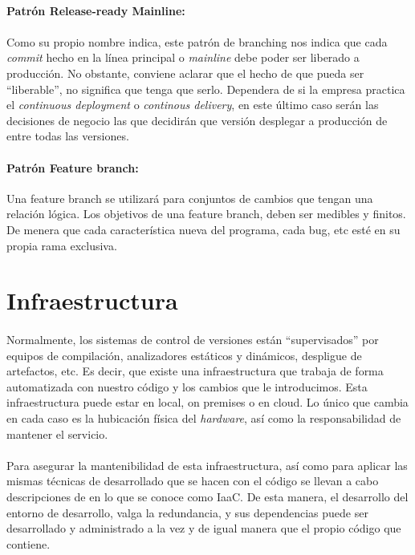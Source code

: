 \paragraph{Patrón Release-ready Mainline:}\label{sec:release-ready}

\paragraph{}Como su propio nombre indica, este patrón de branching nos indica que cada
\emph{commit} hecho en la línea principal o \emph{mainline} debe poder ser liberado a
producción. No obstante, conviene aclarar que el hecho de que pueda ser ``liberable'',
no significa que tenga que serlo. Dependera de si la empresa practica el \emph{continuous
deployment} o \emph{continous delivery}, en este último caso serán las decisiones de
negocio las que decidirán que versión desplegar a producción de entre todas las versiones.


\paragraph{Patrón Feature branch:} Una feature branch se utilizará para conjuntos de
cambios que tengan una relación lógica. Los objetivos de una feature branch, deben ser
medibles y finitos. De menera que cada característica nueva del programa, cada bug, etc
esté en su propia rama exclusiva.

\section{Infraestructura}\label{sec:infraestructura}

\paragraph{}Normalmente, los sistemas de control de versiones están ``supervisados''
por equipos de compilación, analizadores estáticos y dinámicos, despligue de artefactos,
etc. Es decir, que existe una infraestructura que trabaja de forma automatizada con
nuestro código y los cambios que le introducimos. Esta infraestructura puede estar
en local, \gls{on premises} o en cloud. Lo único que cambia en cada caso es la hubicación
física del \emph{hardware}, así como la responsabilidad de mantener el servicio.

\paragraph{}Para asegurar la mantenibilidad de esta infraestructura, así como para aplicar
las mismas técnicas de desarrollado que se hacen con el código se llevan a cabo descripciones
de  en lo que se conoce como \gls{IaaC}. De esta manera, el desarrollo
del entorno de desarrollo, valga la redundancia, y sus dependencias puede ser desarrollado
y administrado a la vez y de igual manera que el propio código que contiene.

